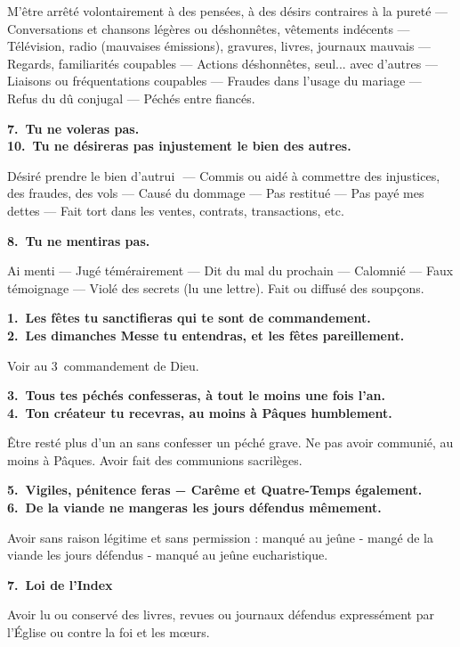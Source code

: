 \documentclass[%
a5paper%
,11pt%
,DIV=15%
,titlepage=on%
,headings=optiontoheadandtoc%
,headings=small%
,parskip=false%
,openany%
]{scrbook}
\newcommand{\commandement}[1]{\noindent\textbf{#1}}
\begin{document}
M’être arrêté volontairement à des pensées, à des désirs contraires à la pureté
— Conversations et chansons légères ou
déshonnêtes, vêtements indécents — Télévision, radio (mauvaises émissions),
gravures, livres, journaux mauvais — Regards, familiarités coupables — Actions
déshonnêtes, seul... avec d’autres —
Liaisons ou fréquentations coupables —
Fraudes dans l’usage du mariage — Refus
du dû conjugal — Péchés entre fiancés.

\commandement{7. Tu ne voleras pas.\\
10. Tu ne désireras pas injustement le bien des autres.}

Désiré prendre le bien d’autrui ­ — Commis ou aidé à commettre des injustices,
des fraudes, des vols — Causé du dommage — Pas restitué — Pas payé mes dettes — Fait tort dans les ventes, contrats,
transactions, etc.

\commandement{8. Tu ne mentiras pas.}

Ai menti — Jugé témérairement — Dit
du mal du prochain — Calomnié — Faux
témoignage — Violé des secrets (lu une
lettre). Fait ou diffusé des soupçons.



\commandement{1. Les fêtes tu sanctifieras qui te sont de commandement.\\
2. Les dimanches Messe tu entendras, et les fêtes pareillement.}

Voir au 3\ieme\ commandement de Dieu.

\commandement{3. Tous tes péchés confesseras, à tout le moins une fois l’an.\\
4. Ton créateur tu recevras, au moins à Pâques humblement.}

Être resté plus d'un an sans confesser un péché grave. Ne pas avoir communié, au moins à Pâques. Avoir fait des communions sacrilèges.

\commandement{5. Vigiles, pénitence feras − Carême et Quatre-Temps également.\\
6. De la viande ne mangeras les jours défendus mêmement.}

Avoir sans raison légitime et sans permission : manqué au jeûne - mangé de la viande les jours défendus - manqué au
jeûne eucharistique.

\commandement{7. Loi de l'Index}

Avoir lu ou conservé des livres, revues ou journaux défendus expressément par l’Église ou contre la foi et les mœurs.


\end{document}
